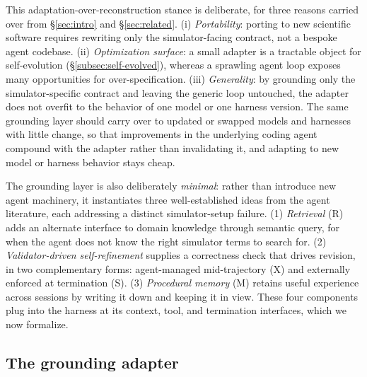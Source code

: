 \documentclass{article}
\begin{document}
This adaptation-over-reconstruction stance is deliberate, for three reasons carried over from \S\ref{sec:intro} and \S\ref{sec:related}. (i) \emph{Portability}: porting to new scientific software requires rewriting only the simulator-facing contract, not a bespoke agent codebase. (ii) \emph{Optimization surface}: a small adapter is a tractable object for self-evolution (\S\ref{subsec:self-evolved}), whereas a sprawling agent loop exposes many opportunities for over-specification. (iii) \emph{Generality}: by grounding only the simulator-specific contract and leaving the generic loop untouched, the adapter does not overfit to the behavior of one model or one harness version. The same grounding layer should carry over to updated or swapped models and harnesses with little change, so that improvements in the underlying coding agent compound with the adapter rather than invalidating it, and adapting to new model or harness behavior stays cheap.

The grounding layer is also deliberately \emph{minimal}: rather than introduce new agent machinery, it instantiates three well-established ideas from the agent literature, each addressing a distinct simulator-setup failure. (1) \emph{Retrieval} (R) adds an alternate interface to domain knowledge through semantic query, for when the agent does not know the right simulator terms to search for. (2) \emph{Validator-driven self-refinement} supplies a correctness check that drives revision, in two complementary forms: agent-managed mid-trajectory (X) and externally enforced at termination (S). (3) \emph{Procedural memory} (M) retains useful experience across sessions by writing it down and keeping it in view. These four components plug into the harness at its context, tool, and termination interfaces, which we now formalize.

\subsection{The grounding adapter}
\label{subsec:overview}
\end{document}
